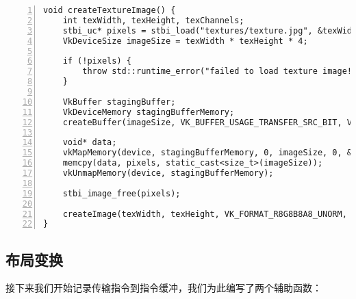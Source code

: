 \documentclass{ctexart}
\begin{document}
\begin{lstlisting}[language={[ANSI]C},keywordstyle=\color{blue!70},commentstyle=\color{red!50!green!50!blue!50},frame=shadowbox, rulesepcolor=\color{red!20!green!20!blue!20},basicstyle=\small,numbers=left, numberstyle=\tiny,breaklines=true]
void createTextureImage() {
	int texWidth, texHeight, texChannels;
	stbi_uc* pixels = stbi_load("textures/texture.jpg", &texWidth, &texHeight, &texChannels, STBI_rgb_alpha);
	VkDeviceSize imageSize = texWidth * texHeight * 4;

	if (!pixels) {
		throw std::runtime_error("failed to load texture image!");
	}

	VkBuffer stagingBuffer;
	VkDeviceMemory stagingBufferMemory;
	createBuffer(imageSize, VK_BUFFER_USAGE_TRANSFER_SRC_BIT, VK_MEMORY_PROPERTY_HOST_VISIBLE_BIT | VK_MEMORY_PROPERTY_HOST_COHERENT_BIT, stagingBuffer, stagingBufferMemory);

	void* data;
	vkMapMemory(device, stagingBufferMemory, 0, imageSize, 0, &data);
	memcpy(data, pixels, static_cast<size_t>(imageSize));
	vkUnmapMemory(device, stagingBufferMemory);

	stbi_image_free(pixels);

	createImage(texWidth, texHeight, VK_FORMAT_R8G8B8A8_UNORM, VK_IMAGE_TILING_OPTIMAL, VK_IMAGE_USAGE_TRANSFER_DST_BIT | VK_IMAGE_USAGE_SAMPLED_BIT, VK_MEMORY_PROPERTY_DEVICE_LOCAL_BIT, textureImage, textureImageMemory);
}
\end{lstlisting}

\subsection{布局变换}

接下来我们开始记录传输指令到指令缓冲，我们为此编写了两个辅助函数：
\end{document}
